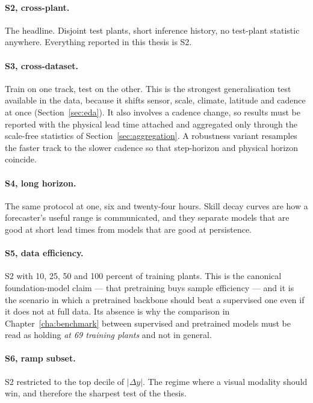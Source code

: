 \paragraph{S2, cross-plant.} The headline. Disjoint test plants, short inference history, no
test-plant statistic anywhere. Everything reported in this thesis is S2.

\paragraph{S3, cross-dataset.} Train on one track, test on the other. This is the strongest
generalisation test available in the data, because it shifts sensor, scale, climate, latitude
and cadence at once (Section~\ref{sec:eda}). It also involves a cadence change, so results
must be reported with the physical lead time attached and aggregated only through the
scale-free statistics of Section~\ref{sec:aggregation}. A robustness variant resamples the
faster track to the slower cadence so that step-horizon and physical horizon coincide.

\paragraph{S4, long horizon.} The same protocol at one, six and twenty-four hours. Skill decay
curves are how a forecaster's useful range is communicated, and they separate models that are
good at short lead times from models that are good at persistence.

\paragraph{S5, data efficiency.} S2 with 10, 25, 50 and 100 percent of training plants. This
is the canonical foundation-model claim --- that pretraining buys sample efficiency --- and it
is the scenario in which a pretrained backbone should beat a supervised one even if it does
not at full data. Its absence is why the comparison in Chapter~\ref{cha:benchmark} between
supervised and pretrained models must be read as holding \emph{at 69 training plants} and not
in general.

\paragraph{S6, ramp subset.} S2 restricted to the top decile of $|\Delta y|$. The regime where
a visual modality should win, and therefore the sharpest test of the thesis.

